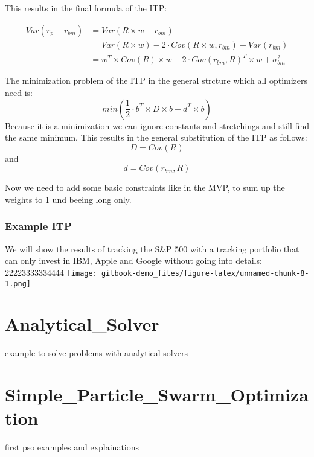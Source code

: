 \documentclass[
  oneside]{book}
\begin{document}
This results in the final formula of the ITP:

\begin{equation}
  \begin{split}
   Var(r_{p}-r_{bm}) & = Var(R \times w - r_{bm}) \\
   & = Var(R \times w) - 2 \cdot Cov(R \times w,r_{bm}) + Var(r_{bm})  \\
   & = w^T \times Cov(R) \times w - 2 \cdot Cov(r_{bm}, R)^T \times w + \sigma_{bm}^2
   \end{split}
   \label{eq:ITP}
\end{equation}

The minimization problem of the ITP in the general strcture which all optimizers need is:
\[
  min(\frac{1}{2} \cdot b^T \times D \times b -d^T \times b)
\]
Because it is a minimization we can ignore constants and stretchings and still find the same minimum. This results in the general substitution of the ITP as follows:
\[
  D = Cov(R)
\]
and
\[
d = Cov(r_{bm}, R)
\]

Now we need to add some basic constraints like in the MVP, to sum up the weights to 1 und beeing long only.

\hypertarget{example-itp}{%
\subsection{Example ITP}\label{example-itp}}

We will show the results of tracking the S\&P 500 with a tracking portfolio that can only invest in IBM, Apple and Google without going into details:
22223333334444
\texttt{[image: gitbook-demo\_files/figure-latex/unnamed-chunk-8-1.png]}

\hypertarget{analytical_solver}{%
\chapter{Analytical\_Solver}\label{analytical_solver}}

example to solve problems with analytical solvers

\hypertarget{simple_particle_swarm_optimization}{%
\chapter{Simple\_Particle\_Swarm\_Optimization}\label{simple_particle_swarm_optimization}}

first pso examples and explainations

  
\end{document}
